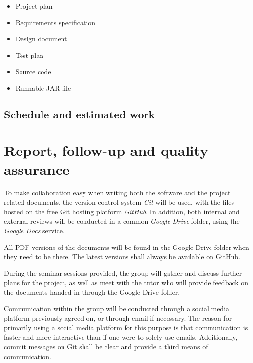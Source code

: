 \documentclass[12pt,titlepage]{article}
\begin{document}
\begin{itemize}
	\item Project plan
	\item Requirements specification
	\item Design document
	\item Test plan
	\item Source code
	\item Runnable JAR file
\end{itemize}

\subsection{Schedule and estimated work}


\section{Report, follow-up and quality assurance}

To make collaboration easy when writing both the software and the project
related documents, the version control system \textit{Git} will be used, with
the files hosted on the free Git hosting platform \textit{GitHub}. In addition,
both internal and external reviews will be conducted in a common \textit{Google
Drive} folder, using the \textit{Google Docs} service.

All PDF versions of the documents will be found in the Google Drive folder when
they need to be there. The latest versions shall always be available on GitHub.

During the seminar sessions provided, the group will gather and discuss further
plans for the project, as well as meet with the tutor who will provide feedback
on the documents handed in through the Google Drive folder.

Communication within the group will be conducted through a social media platform
previously agreed on, or through email if necessary. The reason for primarily
using a social media platform for this purpose is that communication is faster
and more interactive than if one were to solely use emails. Additionally, commit
messages on Git shall be clear and provide a third means of communication.


\end{document}
